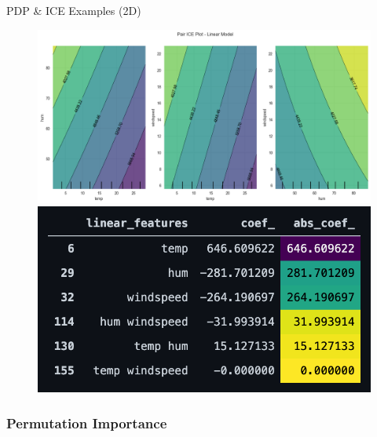 \documentclass[10pt]{beamer}
\begin{document}
\begin{frame}{PDP \& ICE Examples (2D)}
\begin{center}
  \begin{figure}
    \includegraphics[scale=0.35]{images/interpretable_ml_87_0.png}
    \includegraphics[scale=0.3]{images/interaction_coef.png}
  \end{figure}
\end{center}
\end{frame}


\subsubsection{Permutation Importance}
\end{document}

